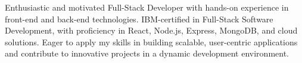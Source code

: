 

\begin{cvparagraph}

\textsf{Enthusiastic and motivated Full-Stack Developer with hands-on experience in front-end and back-end technologies. IBM-certified in Full-Stack Software Development, with proficiency in React, Node.js, Express, MongoDB, and cloud solutions. Eager to apply my skills in building scalable, user-centric applications and contribute to innovative projects in a dynamic development environment.}

\end{cvparagraph}
